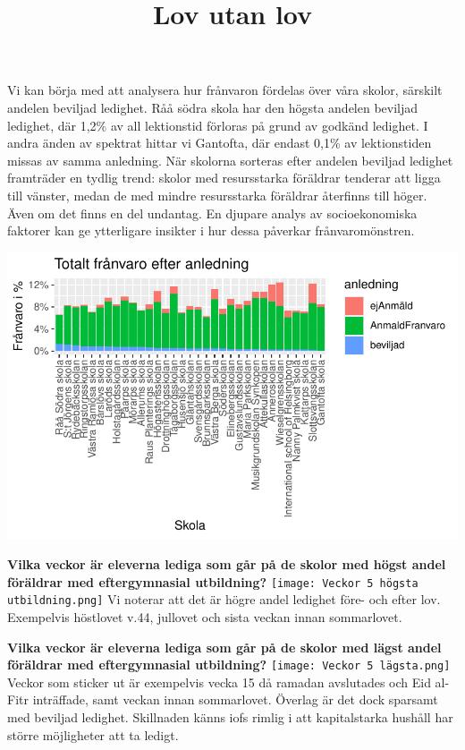 \documentclass[
  letterpaper,
  DIV=11,
  numbers=noendperiod]{scrartcl}
\title{Lov utan lov}
\author{}
\date{}
\begin{document}
\maketitle

Vi kan börja med att analysera hur frånvaron fördelas över våra skolor,
särskilt andelen beviljad ledighet. Råå södra skola har den högsta
andelen beviljad ledighet, där 1,2\% av all lektionstid förloras på
grund av godkänd ledighet. I andra änden av spektrat hittar vi Gantofta,
där endast 0,1\% av lektionstiden missas av samma anledning. När
skolorna sorteras efter andelen beviljad ledighet framträder en tydlig
trend: skolor med resursstarka föräldrar tenderar att ligga till
vänster, medan de med mindre resursstarka föräldrar återfinns till
höger. Även om det finns en del undantag. En djupare analys av
socioekonomiska faktorer kan ge ytterligare insikter i hur dessa
påverkar frånvaromönstren.

\includegraphics{test2_files/figure-pdf/unnamed-chunk-2-1.pdf}

\textbf{Vilka veckor är eleverna lediga som går på de skolor med högst
andel föräldrar med eftergymnasial utbildning?}
\texttt{[image: Veckor 5 högsta utbildning.png]} Vi noterar att det är
högre andel ledighet före- och efter lov. Exempelvis höstlovet v.44,
jullovet och sista veckan innan sommarlovet.

\textbf{Vilka veckor är eleverna lediga som går på de skolor med lägst
andel föräldrar med eftergymnasial utbildning?}
\texttt{[image: Veckor 5 lägsta.png]} Veckor som sticker ut är
exempelvis vecka 15 då ramadan avslutades och Eid al-Fitr inträffade,
samt veckan innan sommarlovet. Överlag är det dock sparsamt med beviljad
ledighet. Skillnaden känns iofs rimlig i att kapitalstarka hushåll har
större möjligheter att ta ledigt.
\end{document}

